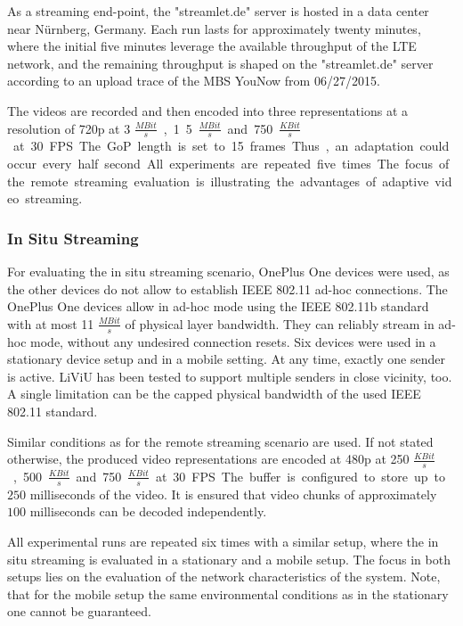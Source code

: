 As a streaming end-point, the "streamlet.de" server is hosted in a data center near N\"urnberg, Germany.
Each run lasts for approximately twenty minutes, where the initial five minutes leverage the available throughput of the \ac{LTE} network, and the remaining throughput is shaped on the "streamlet.de" server according to an upload trace of the \ac{MBS} YouNow from 06/27/2015.

The videos are recorded and then encoded into three representations at a resolution of \ac{720p} at 3 \unit{$\frac{MBit}{s}$}, 1.5 \unit{$\frac{MBit}{s}$} and 750 \unit{$\frac{KBit}{s}$} at 30 \unit{\ac{FPS}}. 
The \ac{GoP} length is set to 15 frames. 
Thus, an adaptation could occur every half second.

All experiments are repeated five times.
The focus of the remote streaming evaluation is illustrating the advantages of adaptive video streaming.
\subsubsection{In Situ Streaming}
For evaluating the in situ streaming scenario, OnePlus One devices were used, as the other devices do not allow to establish IEEE 802.11 ad-hoc connections.
The OnePlus One devices allow in ad-hoc mode using the IEEE 802.11b standard with at most 11 $\unit{\frac{MBit}{s}}$ of physical layer bandwidth.
They can reliably stream in ad-hoc mode, without any undesired connection resets.
Six devices were used in a stationary device setup and in a mobile setting.
At any time, exactly one sender is active.
\ac{LiViU} has been tested to support multiple senders in close vicinity, too.
A single limitation can be the capped physical bandwidth of the used \ac{IEEE} 802.11 standard.

Similar conditions as for the remote streaming scenario are used.
If not stated otherwise, the produced video representations are encoded at \ac{480p} at 250 \unit{$\frac{KBit}{s}$}, 500 \unit{$\frac{KBit}{s}$} and 750 \unit{$\frac{KBit}{s}$} at 30 \unit{\ac{FPS}}.
The buffer is configured to store up to $250$ milliseconds of the video. 
It is ensured that video chunks of approximately $100$ milliseconds can be decoded independently. 

All experimental runs are repeated six times with a similar setup, where the in situ streaming is evaluated in a stationary and a mobile setup.
The focus in both setups lies on the evaluation of the network characteristics of the system.
Note, that for the mobile setup the same environmental conditions as in the stationary one cannot be guaranteed.
